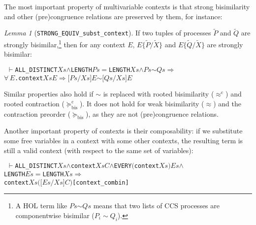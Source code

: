 \documentclass[GCNS]{yincog}
\renewcommand{\HOLinline}[1]{\mbox{\textup{\texttt{#1}}}}
\renewcommand{\HOLConst}[1]{\texttt{#1}}
\renewcommand{\HOLBoundVar}[1]{\ensuremath{\mathit{#1}}}
\renewcommand{\HOLFreeVar}[1]{\ensuremath{\mathit{#1}}}
\renewcommand{\HOLSymConst}[1]{#1}
\renewcommand{\HOLTokenConj}{\ensuremath{\wedge}}
\renewcommand{\HOLTokenForall}{\ensuremath{\forall \,}}
\renewcommand{\HOLTokenTurnstile}{\ensuremath{\:\:\vdash}}
\theoremstyle{remark}
\theoremstyle{theorem}
\newtheorem{lemma}[definition]{Lemma}
\theoremstyle{remark}
\newcommand{\HOLTokenStrongEQ}{$\sim$}
\renewcommand{\HOLTokenImp}{\ensuremath{\Longrightarrow}}
\newcommand{\multivariate}{multivariable\xspace}
\renewcommand{\tilde}{\widetilde}
\newcommand{\rapprox}{\mathrel{\approx^{\mathrm{c}}}}
\newcommand{\wbvtex}{\approx}
\newcommand{\mcontrBIS}{\mathrel{\succeq_{\mathrm{bis}}}}
\newcommand{\rcontr}{\mathrel{\succeq^{\mathrm{c}}_{\mathrm{bis}}}}
\newcommand{\til}{\tilde}
\begin{document}
The most important property of \multivariate contexts is that strong bisimilarity
and other (pre)congruence relations are preserved by them, for instance:
%
\begin{lemma}[\texttt{STRONG\_EQUIV\_subst\_context}]
If two tuples of processes $\til P$ and $\til Q$ are strongly bisimilar,\footnote{A
HOL term like
\HOLinline{\HOLFreeVar{Ps}\\\;\HOLSymConst{\HOLTokenStrongEQ}\\\;\HOLFreeVar{Qs}}
means that two lists of CCS processes are componentwise bisimilar ($P_i
\sim Q_i$).} then for any context $E$, $E\{\til P/\til X\}$ and
$E\{\til Q/\til X\}$ are strongly bisimilar:
%
\begin{alltt}
\HOLTokenTurnstile{} \HOLConst{ALL\_DISTINCT} \HOLFreeVar{Xs} \HOLSymConst{\HOLTokenConj{}} \HOLConst{LENGTH} \HOLFreeVar{Ps} \HOLSymConst{\ensuremath{=}} \HOLConst{LENGTH} \HOLFreeVar{Xs} \HOLSymConst{\HOLTokenConj{}} \HOLFreeVar{Ps} \HOLSymConst{\HOLTokenStrongEQ} \HOLFreeVar{Qs} \HOLSymConst{\HOLTokenImp{}}
   \HOLSymConst{\HOLTokenForall{}}\HOLBoundVar{E}. \HOLConst{context} \HOLFreeVar{Xs} \HOLBoundVar{E} \HOLSymConst{\HOLTokenImp{}} \ensuremath{[}\HOLFreeVar{Ps}\ensuremath{/}\HOLFreeVar{Xs}\ensuremath{]} \HOLBoundVar{E} \HOLSymConst{\HOLTokenStrongEQ} \ensuremath{[}\HOLFreeVar{Qs}\ensuremath{/}\HOLFreeVar{Xs}\ensuremath{]} \HOLBoundVar{E}
\end{alltt}
%
\end{lemma}
%
Similar properties also hold if $\sim $ is replaced with rooted bisimilarity
($\rapprox $) and rooted contraction ($\rcontr $). It does not hold for
weak bisimilarity ($\wbvtex $) and the contraction preorder ($
\mcontrBIS $), as they are not (pre)congruence relations.

Another important property of contexts is their composability: if we substitute
some free variables in a context with some other contexts, the resulting
term is still a valid context (with respect to the same set of variables):
%
\begin{alltt}
\HOLTokenTurnstile{} \HOLConst{ALL\_DISTINCT} \HOLFreeVar{Xs} \HOLSymConst{\HOLTokenConj{}} \HOLConst{context} \HOLFreeVar{Xs} \HOLFreeVar{C} \HOLSymConst{\HOLTokenConj{}} \HOLConst{EVERY} \ensuremath{(}\HOLConst{context} \HOLFreeVar{Xs}\ensuremath{)} \HOLFreeVar{Es} \HOLSymConst{\HOLTokenConj{}}
   \HOLConst{LENGTH} \HOLFreeVar{Es} \HOLSymConst{\ensuremath{=}} \HOLConst{LENGTH} \HOLFreeVar{Xs} \HOLSymConst{\HOLTokenImp{}}
   \HOLConst{context} \HOLFreeVar{Xs} \ensuremath{(}\ensuremath{[}\HOLFreeVar{Es}\ensuremath{/}\HOLFreeVar{Xs}\ensuremath{]} \HOLFreeVar{C}\ensuremath{)}\hfill{[context\_combin]}
\end{alltt}
\end{document}
